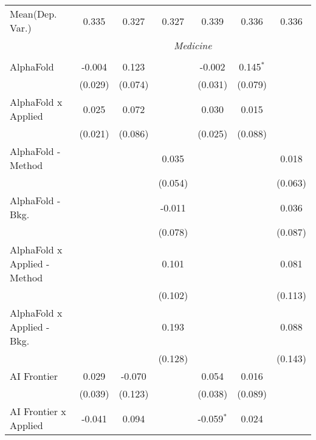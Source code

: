 \begin{tabular}{lcccccc}
Mean(Dep. Var.) & 0.335 & 0.327 & 0.327 & 0.339 & 0.336 & 0.336 \\
 & \multicolumn{6}{c}{\textit{Medicine}} \\ \\
   AlphaFold                      & -0.004  & 0.123        &                & -0.002       & 0.145$^{*}$  &   \\   
                                  & (0.029) & (0.074)      &                & (0.031)      & (0.079)      &   \\   
   AlphaFold x Applied            & 0.025   & 0.072        &                & 0.030        & 0.015        &   \\   
                                  & (0.021) & (0.086)      &                & (0.025)      & (0.088)      &   \\   
   AlphaFold - Method             &         &              & 0.035          &              &              & 0.018\\   
                                  &         &              & (0.054)        &              &              & (0.063)\\   
   AlphaFold - Bkg.               &         &              & -0.011         &              &              & 0.036\\   
                                  &         &              & (0.078)        &              &              & (0.087)\\   
   AlphaFold x Applied - Method   &         &              & 0.101          &              &              & 0.081\\   
                                  &         &              & (0.102)        &              &              & (0.113)\\   
   AlphaFold x Applied - Bkg.     &         &              & 0.193          &              &              & 0.088\\   
                                  &         &              & (0.128)        &              &              & (0.143)\\   
   AI Frontier                    & 0.029   & -0.070       &                & 0.054        & 0.016        &   \\   
                                  & (0.039) & (0.123)      &                & (0.038)      & (0.089)      &   \\   
   AI Frontier x Applied          & -0.041  & 0.094        &                & -0.059$^{*}$ & 0.024        &   \\   

\end{tabular}
